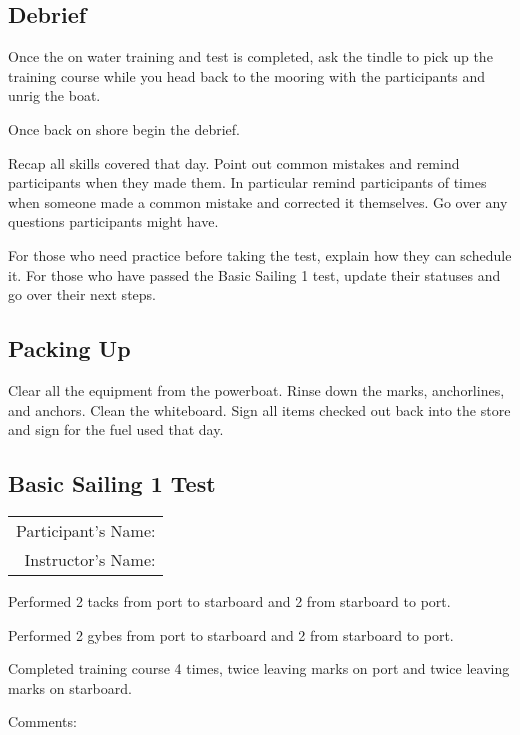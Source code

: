\documentclass[12pt]{scrartcl}
\begin{document}
\subsection{Debrief} \label{subsec: Debrief}

Once the on water training and test is completed, ask the tindle to pick up the training course while you head back to the mooring with the participants and unrig the boat.

Once back on shore begin the debrief.

Recap all skills covered that day. Point out common mistakes and remind participants when they made them. In particular remind participants of times when someone made a common mistake and corrected it themselves. Go over any questions participants might have.

For those who need practice before taking the test, explain how they can schedule it. For those who have passed the Basic Sailing 1 test, update their statuses and go over their next steps.

\subsection{Packing Up} \label{subsec:packing up}

Clear all the equipment from the powerboat. Rinse down the marks, anchorlines, and anchors. Clean the whiteboard. Sign all items checked out back into the store and sign for the fuel used that day.

\newpage
\thispagestyle{empty}
\begin{Large}

\section{Basic Sailing 1 Test} \label{sec:test}

\begin{tabular}{r}
	Participant's Name:\\
	Instructor's Name:\\
\end{tabular}

\vspace{3cm}

\begin{test}
	\item Performed 2 tacks from port to starboard and 2 from starboard to port.
	\item Performed 2 gybes from port to starboard and 2 from starboard to port.
	\item Completed training course 4 times, twice leaving marks on port and twice leaving marks on starboard.
\end{test}

\vspace{3cm}

Comments:

\end{Large}
\end{document}
